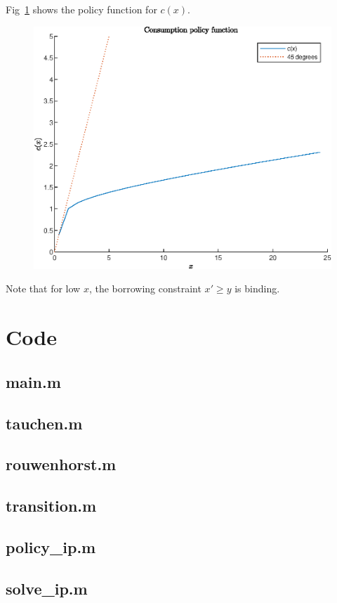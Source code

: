 \documentclass[12pt]{article}
\newcommand{\1}{{\bf 1}} %
\begin{document}
\begin{enumerate}[(a)]
	Fig~\ref{fig:fig4} shows the policy function for $c(x)$.
	\begin{figure}[H]
		\centering
		\includegraphics[width=0.7\linewidth]{fig4}
		\label{fig:fig4}
	\end{figure}

Note that for low $x$, the borrowing constraint $x'\geq y$ is binding.
\end{enumerate}
	
\section*{Code}
\subsection*{main.m}

\subsection*{tauchen.m}

\subsection*{rouwenhorst.m}

\subsection*{transition.m}

\subsection*{policy\_ip.m}

\subsection*{solve\_ip.m}

\end{document}
